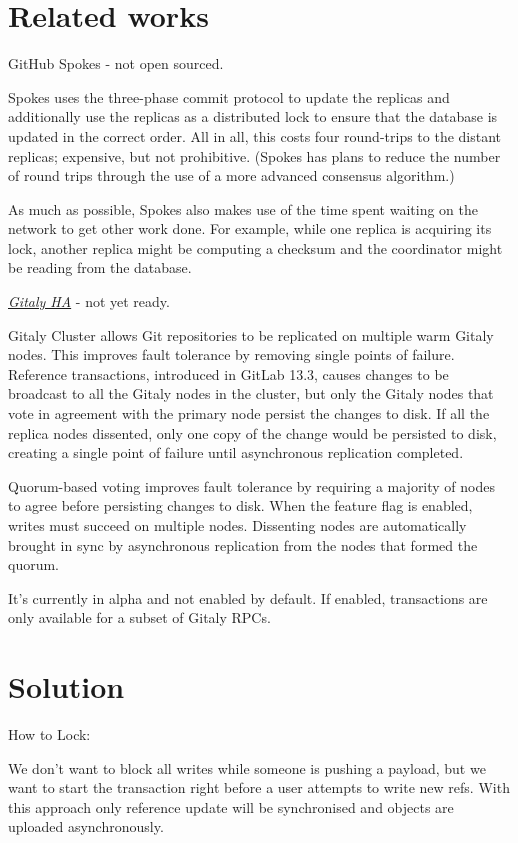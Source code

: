 \documentclass[acmlarge, screen, nonacm]{acmart}
\begin{document}
\section{Related works}

GitHub Spokes - not open sourced.

Spokes uses the three-phase commit protocol to update the replicas and additionally use the replicas as a distributed lock
to ensure that the database is updated in the correct order.
All in all, this costs four round-trips to the distant replicas;
expensive, but not prohibitive.
(Spokes has plans to reduce the number of round trips through the use of a more advanced consensus algorithm.)

As much as possible, Spokes also makes use of the time spent waiting on the network to get other work done.
For example, while one replica is acquiring its lock,
another replica might be computing a checksum and the coordinator might be reading from the database.

\emph{\href{https://gitlab.com/groups/gitlab-org/-/epics/1189}{Gitaly HA}} - not yet ready.

Gitaly Cluster allows Git repositories to be replicated on multiple warm Gitaly nodes.
This improves fault tolerance by removing single points of failure.
Reference transactions, introduced in GitLab 13.3,
causes changes to be broadcast to all the Gitaly nodes in the cluster,
but only the Gitaly nodes that vote in agreement with the primary node persist the changes to disk.
If all the replica nodes dissented, only one copy of the change would be persisted to disk,
creating a single point of failure until asynchronous replication completed.

Quorum-based voting improves fault tolerance by requiring a majority of nodes to agree before persisting changes to disk.
When the feature flag is enabled, writes must succeed on multiple nodes.
Dissenting nodes are automatically brought in sync by asynchronous replication from the nodes that formed the quorum.

It's currently in alpha and not enabled by default.
If enabled, transactions are only available for a subset of Gitaly RPCs.

\section{Solution}

How to Lock:

We don't want to block all writes while someone is pushing a payload,
but we want to start the transaction right before a user attempts to write new refs.
With this approach only reference update will be synchronised and objects are uploaded asynchronously.
\end{document}
